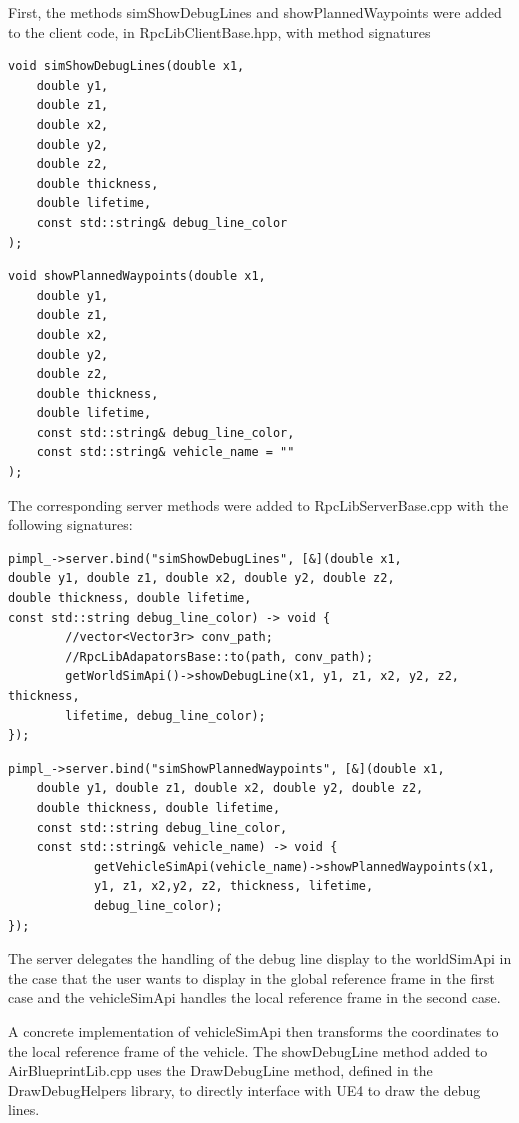 First, the methods simShowDebugLines and showPlannedWaypoints were added to the client code, in RpcLibClientBase.hpp, with method signatures
\begin{verbatim}
void simShowDebugLines(double x1, 
    double y1,
    double z1,
    double x2,
    double y2,
    double z2,
    double thickness, 
    double lifetime,
    const std::string& debug_line_color
);
\end{verbatim}
\begin{verbatim}
void showPlannedWaypoints(double x1, 
    double y1, 
    double z1, 
    double x2, 
    double y2, 
    double z2, 
    double thickness, 
    double lifetime,
    const std::string& debug_line_color,
    const std::string& vehicle_name = ""
);
\end{verbatim}

The corresponding server methods were added to RpcLibServerBase.cpp with the following signatures:
\begin{verbatim}
pimpl_->server.bind("simShowDebugLines", [&](double x1,
double y1, double z1, double x2, double y2, double z2,
double thickness, double lifetime, 
const std::string debug_line_color) -> void {
		//vector<Vector3r> conv_path;
		//RpcLibAdapatorsBase::to(path, conv_path);
		getWorldSimApi()->showDebugLine(x1, y1, z1, x2, y2, z2, thickness, 
		lifetime, debug_line_color);
});
\end{verbatim}

\begin{verbatim}
pimpl_->server.bind("simShowPlannedWaypoints", [&](double x1, 
    double y1, double z1, double x2, double y2, double z2, 
    double thickness, double lifetime, 
    const std::string debug_line_color,
    const std::string& vehicle_name) -> void {
            getVehicleSimApi(vehicle_name)->showPlannedWaypoints(x1, 
            y1, z1, x2,y2, z2, thickness, lifetime, 
            debug_line_color);
});
\end{verbatim}

The server delegates the handling of the debug line display to the worldSimApi in the case that the user wants to display in the global reference frame in the first case and the vehicleSimApi handles the local reference frame in the second case. 

A concrete implementation of vehicleSimApi then transforms the coordinates to the local reference frame of the vehicle. The showDebugLine method added to AirBlueprintLib.cpp uses the DrawDebugLine method, defined in the DrawDebugHelpers library, to directly interface with UE4 to draw the debug lines.

